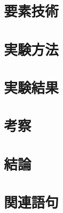 \documentclass[a4j]{jarticle}
\begin{document}
\section{要素技術}


\section{実験方法}


\section{実験結果}


\section{考察} %


\section{結論}


\section{関連語句}

\end{document}
